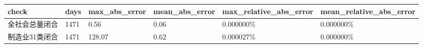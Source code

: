 \begin{tabular}{llllll}
\toprule
check & days & max\_abs\_error & mean\_abs\_error & max\_relative\_abs\_error & mean\_relative\_abs\_error \\
\midrule
全社会总量闭合 & 1471 & 0.56 & 0.06 & 0.000000\% & 0.000000\% \\
制造业31类闭合 & 1471 & 128.07 & 0.62 & 0.000027\% & 0.000000\% \\
\bottomrule
\end{tabular}
